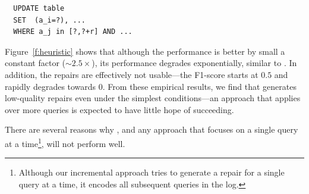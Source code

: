 {\scriptsize
\begin{verbatim}
  UPDATE table
  SET  (a_i=?), ...
  WHERE a_j in [?,?+r] AND ...
\end{verbatim}
}

Figure~\ref{f:heuristic} shows that although the performance is better by small a constant factor ($\sim 2.5 \times$),
its performance degrades exponentially, similar to \sys.
In addition, the repairs are effectively not usable---the F1-score starts at $0.5$ and rapidly degrades towards $0$.
From these empirical results, we find that \dt generates low-quality repairs even under the simplest conditions---an approach
that applies \dt over more queries is expected to have little hope of succeeding.

There are several reasons why \dt, and any approach that focuses on a single query at a 
time\footnote{Although our incremental approach tries to generate a repair for a single
query at a time, it encodes all subsequent queries in the log.}, will not perform well.


